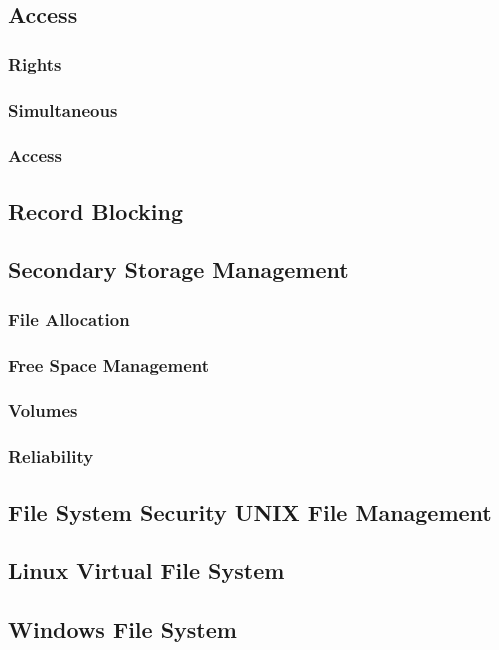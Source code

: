 \subsection{Access }

\subsubsection{Rights }

\subsubsection{Simultaneous}

\subsubsection{Access}

\subsection{Record Blocking}

\subsection{Secondary Storage Management}

\subsubsection{File Allocation}

\subsubsection{Free Space Management }

\subsubsection{Volumes}

\subsubsection{Reliability}

\subsection{File System Security UNIX File Management}

\subsection{Linux Virtual File System }
\subsection{Windows File System}




